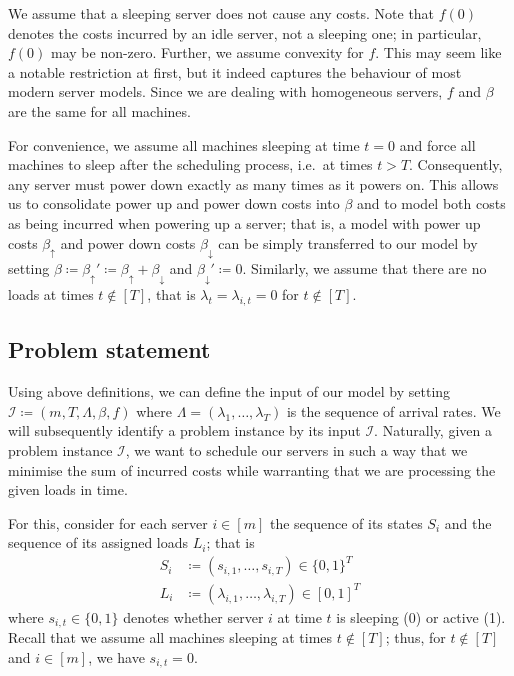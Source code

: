 \documentclass[hidelinks]{article}
\theoremstyle{plain}
\theoremstyle{definition}
\theoremstyle{rem}
\newcommand{\inp}{\mathcal{I}}
\begin{document}
We assume that a sleeping server does not cause any costs. Note that $f(0)$ denotes the costs incurred by an idle server, not a sleeping one; in particular, $f(0)$ may be non-zero. Further, we assume convexity for $f$. This may seem like a notable restriction at first, but it indeed captures the behaviour of most modern server models. Since we are dealing with homogeneous servers, $f$ and $\beta$ are the same for all machines.

For convenience, we assume all machines sleeping at time $t=0$ and force all machines to sleep after the scheduling process, i.e.\ at times $t>T$. Consequently, any server must power down exactly as many times as it powers on. This allows us to consolidate power up and power down costs into $\beta$ and to model both costs as being incurred when powering up a server; that is, a model with power up costs $\beta_\uparrow$ and power down costs $\beta_\downarrow$ can be simply transferred to our model by setting $\beta\coloneqq \beta_\uparrow'\coloneqq\beta_\uparrow+\beta_\downarrow$ and $\beta_\downarrow'\coloneqq0$. Similarly, we assume that there are no loads at times $t\notin[T]$, that is $\lambda_t=\lambda_{i,t}=0$ for $t\notin[T]$.

\subsection{Problem statement}
Using above definitions, we can define the input of our model by setting $\inp\coloneqq(m,T,\Lambda,\beta,f)$ where $\Lambda=(\lambda_1,\ldots,\lambda_T)$ is the sequence of arrival rates. We will subsequently identify a problem instance by its input $\inp$. Naturally, given a problem instance $\inp$, we want to schedule our servers in such a way that we minimise the sum of incurred costs while warranting that we are processing the given loads in time.

For this, consider for each server $i\in[m]$ the sequence of its states $S_i$ and the sequence of its assigned loads $L_i$; that is
\begin{align*}
	S_i&\coloneqq(s_{i,1},\ldots,s_{i,T})\in\{0,1\}^T\\
	L_i&\coloneqq(\lambda_{i,1},\ldots,\lambda_{i,T})\in[0,1]^T
\end{align*}
where $s_{i,t}\in\{0,1\}$ denotes whether server $i$ at time $t$ is sleeping (0) or active (1). Recall that we assume all machines sleeping at times $t\notin[T]$; thus, for $t\notin[T]$ and $i\in[m]$, we have $s_{i,t}=0$.
\end{document}
